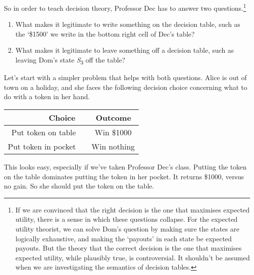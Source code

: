 \documentclass[
  11pt,
  letterpaper,
  DIV=11,
  numbers=noendperiod,
  twoside]{scrartcl}
\begin{document}
So in order to teach decision theory, Professor Dec has to answer two
questions.\footnote{If we are convinced that the right decision is the
  one that maximises expected utility, there is a sense in which these
  questions collapse. For the expected utility theorist, we can solve
  Dom's question by making sure the states are logically exhaustive, and
  making the `payouts' in each state be expected payouts. But the theory
  that the correct decision is the one that maximises expected utility,
  while plausibly true, is controversial. It shouldn't be assumed when
  we are investigating the semantics of decision tables.}

\begin{enumerate}
\def\labelenumi{\arabic{enumi}.}
\item
  What makes it legitimate to write something on the decision table,
  such as the `\$1500' we write in the bottom right cell of Dec's table?
\item
  What makes it legitimate to leave something off a decision table, such
  as leaving Dom's state \emph{S}\textsubscript{3} off the table?
\end{enumerate}

Let's start with a simpler problem that helps with both questions. Alice
is out of town on a holiday, and she faces the following decision choice
concerning what to do with a token in her hand.

\begin{longtable}[]{@{}rc@{}}
\toprule\noalign{}
\textbf{Choice}~ & ~\textbf{Outcome} \\
\midrule\noalign{}
\endhead
\bottomrule\noalign{}
\endlastfoot
Put token on table~ & ~Win \$1000 \\
Put token in pocket~ & ~Win nothing \\
\end{longtable}

This looks easy, especially if we've taken Professor Dec's class.
Putting the token on the table dominates putting the token in her
pocket. It returns \$1000, versus no gain. So she should put the token
on the table.
\end{document}
